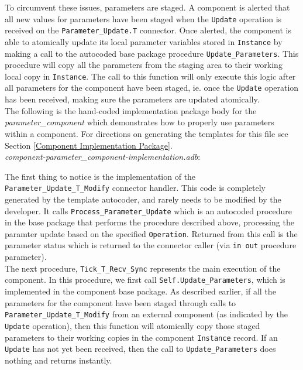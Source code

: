 To circumvent these issues, parameters are staged. A component is alerted that all new values for parameters have been staged when the \texttt{Update} operation is received on the \texttt{Parameter\_Update.T} connector. Once alerted, the component is able to atomically update its local parameter variables stored in \texttt{Instance} by making a call to the autocoded base package procedure \texttt{Update\_Parameters}. This procedure will copy all the parameters from the staging area to their working local copy in \texttt{Instance}. The call to this function will only execute this logic after all parameters for the component have been staged, ie. once the \texttt{Update} operation has been received, making sure the parameters are updated atomically. \\

The following is the hand-coded implementation package body for the \textit{parameter\_component} which demonstrates how to properly use parameters within a component. For directions on generating the templates for this file see Section \ref{Component Implementation Package}. \\

\textit{component-parameter\_component-implementation.adb}:

The first thing to notice is the implementation of the \texttt{Parameter\_Update\_T\_Modify} connector handler. This code is completely generated by the template autocoder, and rarely needs to be modified by the developer. It calls \texttt{Process\_Parameter\_Update} which is an autocoded procedure in the base package that performs the procedure described above, processing the paramter update based on the specified \texttt{Operation}. Returned from this call is the parameter status which is returned to the connector caller (via \texttt{in out} procedure parameter). \\

The next procedure, \texttt{Tick\_T\_Recv\_Sync} represents the main execution of the component. In this procedure, we first call \texttt{Self.Update\_Parameters}, which is implemented in the component base package. As described earlier, if all the parameters for the component have been staged through calls to \texttt{Parameter\_Update\_T\_Modify} from an external component (as indicated by the \texttt{Update} operation), then this function will atomically copy those staged parameters to their working copies in the component \texttt{Instance} record. If an \texttt{Update} has not yet been received, then the call to \texttt{Update\_Parameters} does nothing and returns instantly. \\

